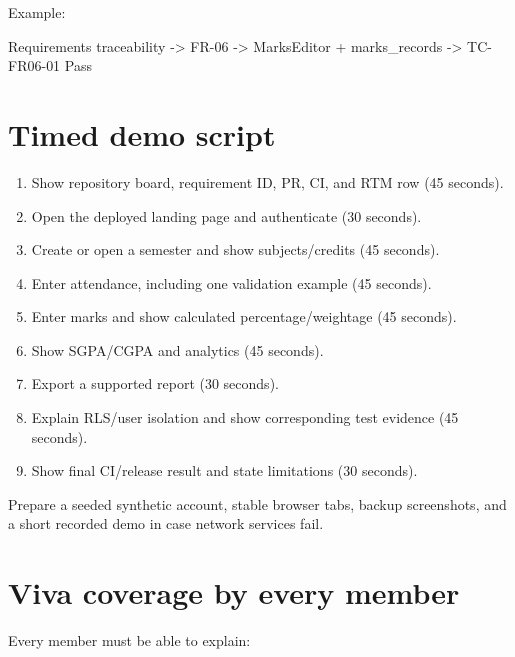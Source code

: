 \documentclass[
  10pt,
  a4paper,
  oneside]{report}
\newenvironment{Shaded}{}{}
\newcommand{\NormalTok}[1]{#1}
\providecommand{\tightlist}{%
  \setlength{\itemsep}{0pt}\setlength{\parskip}{0pt}}
\begin{document}
Example:

\begin{Shaded}
\begin{Highlighting}[]
\NormalTok{Requirements traceability {-}\textgreater{} FR{-}06 {-}\textgreater{} MarksEditor + marks\_records {-}\textgreater{} TC{-}FR06{-}01 Pass}
\end{Highlighting}
\end{Shaded}

\section{Timed demo script}\label{243-timed-demo-script}

\begin{enumerate}
\def\labelenumi{\arabic{enumi}.}
\tightlist
\item
  Show repository board, requirement ID, PR, CI, and RTM row (45
  seconds).
\item
  Open the deployed landing page and authenticate (30 seconds).
\item
  Create or open a semester and show subjects/credits (45 seconds).
\item
  Enter attendance, including one validation example (45 seconds).
\item
  Enter marks and show calculated percentage/weightage (45 seconds).
\item
  Show SGPA/CGPA and analytics (45 seconds).
\item
  Export a supported report (30 seconds).
\item
  Explain RLS/user isolation and show corresponding test evidence (45
  seconds).
\item
  Show final CI/release result and state limitations (30 seconds).
\end{enumerate}

Prepare a seeded synthetic account, stable browser tabs, backup
screenshots, and a short recorded demo in case network services fail.

\section{Viva coverage by every
member}\label{244-viva-coverage-by-every-member}

Every member must be able to explain:
\end{document}
